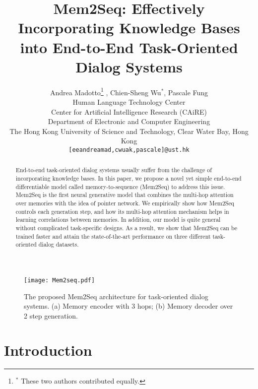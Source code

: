 \documentclass[11pt,a4paper]{article}
\title{Mem2Seq: Effectively Incorporating Knowledge Bases into End-to-End Task-Oriented Dialog Systems}
\author{Andrea Madotto\thanks{$^*$ These two authors contributed equally.} , Chien-Sheng Wu$^*$, Pascale Fung\\
  Human Language Technology Center \\
  Center for Artificial Intelligence Research (CAiRE) \\
  Department of Electronic and Computer Engineering \\
  The Hong Kong University of Science and Technology, Clear Water Bay, Hong Kong \\
  {\tt [eeandreamad,cwuak,pascale]@ust.hk} }
\date{}
\begin{document}
\maketitle
\begin{abstract}
End-to-end task-oriented dialog systems usually suffer from the challenge of incorporating knowledge bases. 
In this paper, we propose a novel yet simple end-to-end differentiable model called memory-to-sequence (Mem2Seq) to address this issue. Mem2Seq is the first neural generative model that combines the multi-hop attention over memories with the idea of pointer network. We empirically show how Mem2Seq controls each generation step, and how its multi-hop attention mechanism helps in learning correlations between memories. In addition, our model is quite general without complicated task-specific designs. As a result, we show that Mem2Seq can be trained faster and attain the state-of-the-art performance on three different task-oriented dialog datasets.
\end{abstract}

\begin{figure*}[t]
\centering
\texttt{[image: Mem2seq.pdf]}
\setlength{\abovecaptionskip}{-10pt} 
\caption{The proposed Mem2Seq architecture for task-oriented dialog systems. (a) Memory encoder with 3 hops; (b) Memory decoder over 2 step generation.}
\label{FIG:MODEL}
\end{figure*}

\section{Introduction}
\end{document}
